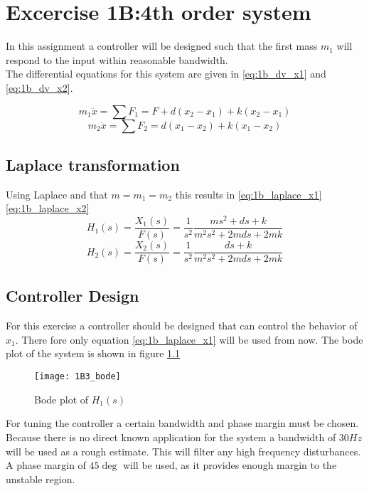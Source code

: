 \documentclass[report.tex]{subfiles}
\begin{document}
\chapter{Excercise 1B:4th order system}
In this assignment a controller will be designed such that the first mass $m_1$ will respond to the input within reasonable bandwidth.\\

The differential equations for this system are given in \ref{eq:1b_dv_x1} and \ref{eq:1b_dv_x2}.

\begin{equation}
m_1\ddot{x} = \sum\nolimits{F_1} = F + d(x_2-x_1) + k(x_2-x_1)
\label{eq:1b_dv_x1}
\end{equation}
\begin{equation}
m_2\ddot{x} = \sum\nolimits{F_2} = d(x_1-x_2)+ k(x_1-x_2)
\label{eq:1b_dv_x2}
\end{equation}

\section{Laplace transformation}
Using Laplace and that $m=m_1=m_2$ this results in \ref{eq:1b_laplace_x1} \ref{eq:1b_laplace_x2}
\begin{equation}
H_1(s) = \frac{X_1(s)}{F(s)}  = \frac{1}{s^2}\frac{ms^2+ds+k}{m^2s^2+2mds+2mk}
\label{eq:1b_laplace_x1}	
\end{equation}
\begin{equation}
H_2(s) = \frac{X_2(s)}{F(s)} = \frac{1}{s^2}\frac{ds+k}{m^2s^2+2mds+2mk}
\label{eq:1b_laplace_x2}
\end{equation}

\section{Controller Design}
For this exercise a controller should be designed that can control the behavior of $x_1$. There fore only equation \ref{eq:1b_laplace_x1} will be used from now. The bode plot of the system is shown in figure \ref{fig:1B3_bode}

\begin{figure}[H] 
	\texttt{[image: 1B3\_bode]}
	\centering
	\caption{Bode plot of $H_1(s)$}
	\label{fig:1B3_bode}
\end{figure}

For tuning the controller a certain bandwidth and phase margin must be chosen. 
Because there is no direct known application for the system a bandwidth of $30 Hz$ will be used as a rough estimate. This will filter any high frequency disturbances. A phase margin of $ 45\deg $ will be used, as it provides enough margin to the unstable region. 
\end{document}

